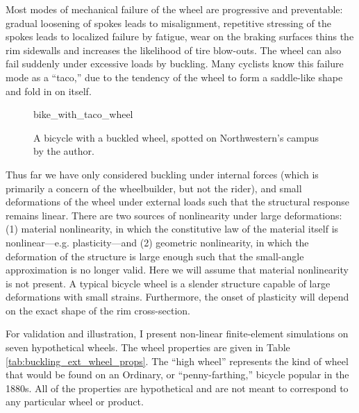 \documentclass[\rootdir/thesis.tex]{subfiles}
\begin{document}
Most modes of mechanical failure of the wheel are progressive and preventable: gradual loosening of spokes leads to misalignment, repetitive stressing of the spokes leads to localized failure by fatigue, wear on the braking surfaces thins the rim sidewalls and increases the likelihood of tire blow-outs. The wheel can also fail suddenly under excessive loads by buckling. Many cyclists know this failure mode as a ``taco,'' due to the tendency of the wheel to form a saddle-like shape and fold in on itself.

\begin{figure}
\centering
{bike_with_taco_wheel}
\caption{A bicycle with a buckled wheel, spotted on Northwestern's campus by the author.}
\label{fig:bike_taco_wheel}
\end{figure}

Thus far we have only considered buckling under internal forces (which is primarily a concern of the wheelbuilder, but not the rider), and small deformations of the wheel under external loads such that the structural response remains linear. There are two sources of nonlinearity under large deformations: (1) material nonlinearity, in which the constitutive law of the material itself is nonlinear---e.g. plasticity---and (2) geometric nonlinearity, in which the deformation of the structure is large enough such that the small-angle approximation is no longer valid. Here we will assume that material nonlinearity is not present. A typical bicycle wheel is a slender structure capable of large deformations with small strains. Furthermore, the onset of plasticity will depend on the exact shape of the rim cross-section.

For validation and illustration, I present non-linear finite-element simulations on seven hypothetical wheels. The wheel properties are given in Table \ref{tab:buckling_ext_wheel_props}. The ``high wheel'' represents the kind of wheel that would be found on an Ordinary, or ``penny-farthing,'' bicycle popular in the 1880s. All of the properties are hypothetical and are not meant to correspond to any particular wheel or product.
\end{document}
